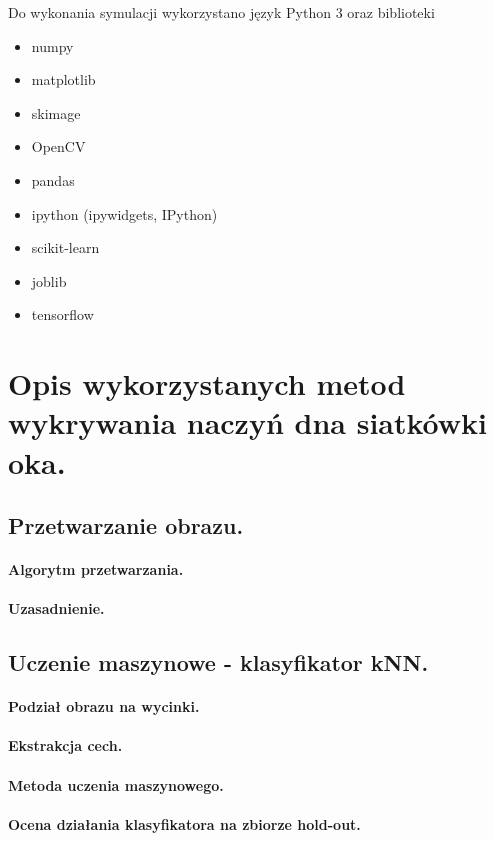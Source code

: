 \documentclass[a4paper, 11pt]{article}
\begin{document}
Do wykonania symulacji wykorzystano język Python 3 oraz biblioteki

\begin{itemize}
	\item numpy
	\item matplotlib
	\item skimage
	\item OpenCV
	\item pandas
	\item ipython (ipywidgets, IPython)
	\item scikit-learn
	\item joblib
	\item tensorflow
\end{itemize}

\section{Opis wykorzystanych metod wykrywania naczyń dna siatkówki oka.}
\subsection{Przetwarzanie obrazu.}
\paragraph{Algorytm przetwarzania.}
\paragraph{Uzasadnienie.}


\subsection{Uczenie maszynowe - klasyfikator kNN.}
\paragraph{Podział obrazu na wycinki.}
\paragraph{Ekstrakcja cech.}
\paragraph{Metoda uczenia maszynowego.}
\paragraph{Ocena działania klasyfikatora na zbiorze hold-out.}
\end{document}
